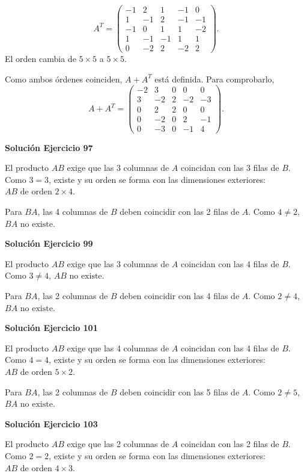 \documentclass[12pt]{article}
\theoremstyle{remark}
\begin{document}
\[
A^T=\begin{pmatrix}-1&2&1&-1&0\\1&-1&2&-1&-1\\-1&0&1&1&-2\\1&-1&-1&1&1\\0&-2&2&-2&2\end{pmatrix}.
\]
El orden cambia de $5\times5$ a $5\times5$.

Como ambos órdenes coinciden, $A+A^T$ está definida. Para comprobarlo,
\[
A+A^T=\begin{pmatrix}-2&3&0&0&0\\3&-2&2&-2&-3\\0&2&2&0&0\\0&-2&0&2&-1\\0&-3&0&-1&4\end{pmatrix}.
\]

\par\bigskip\noindent\textbf{Solución Ejercicio 97}\par\nobreak
El producto $AB$ exige que las 3 columnas de $A$ coincidan con las 3 filas de $B$. Como $3=3$, existe y su orden se forma con las dimensiones exteriores: $\boxed{AB\text{ de orden } 2\times 4}$.

Para $BA$, las 4 columnas de $B$ deben coincidir con las 2 filas de $A$. Como $4\neq2$, $\boxed{BA\text{ no existe}}$.


\par\bigskip\noindent\textbf{Solución Ejercicio 99}\par\nobreak
El producto $AB$ exige que las 3 columnas de $A$ coincidan con las 4 filas de $B$. Como $3\neq4$, $\boxed{AB\text{ no existe}}$.

Para $BA$, las 2 columnas de $B$ deben coincidir con las 4 filas de $A$. Como $2\neq4$, $\boxed{BA\text{ no existe}}$.


\par\bigskip\noindent\textbf{Solución Ejercicio 101}\par\nobreak
El producto $AB$ exige que las 4 columnas de $A$ coincidan con las 4 filas de $B$. Como $4=4$, existe y su orden se forma con las dimensiones exteriores: $\boxed{AB\text{ de orden } 5\times 2}$.

Para $BA$, las 2 columnas de $B$ deben coincidir con las 5 filas de $A$. Como $2\neq5$, $\boxed{BA\text{ no existe}}$.


\par\bigskip\noindent\textbf{Solución Ejercicio 103}\par\nobreak
El producto $AB$ exige que las 2 columnas de $A$ coincidan con las 2 filas de $B$. Como $2=2$, existe y su orden se forma con las dimensiones exteriores: $\boxed{AB\text{ de orden } 4\times 3}$.
\end{document}
